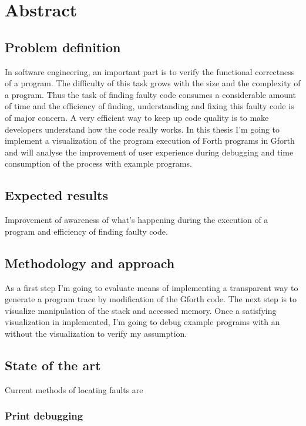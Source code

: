 \chapter*{Abstract}

\section{Problem definition}

In software engineering, an important part is to verify the functional correctness of a program. The difficulty of this task grows with the size and the complexity of a program. Thus the task of finding faulty code consumes a considerable amount of time and the efficiency of finding, understanding and fixing this faulty code is of major concern. A very efficient way to keep up code quality is to make developers understand how the code really works. In this thesis I'm going to implement a visualization of the program execution of Forth programs in Gforth and will analyse the improvement of user experience during debugging and time consumption of the process with example programs.

\section{Expected results}

Improvement of awareness of what's happening during the execution of a program and efficiency of finding faulty code.

\section{Methodology and approach}

As a first step I'm going to evaluate means of implementing a transparent way to generate a program trace by modification of the Gforth code. The next step is to visualize manipulation of the stack and accessed memory. Once a satisfying visualization in implemented, I'm going to debug example programs with an without the visualization to verify my assumption.

\section{State of the art}

Current methods of locating faults are

\subsection{Print debugging}


